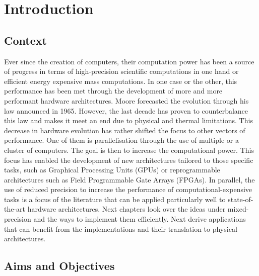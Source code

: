 \chapter{Introduction}\label{chap_intro} %

\label{Chapter1} %



\section{Context}

Ever since the creation of computers, their computation power has been a source of progress in terms of high-precision scientific computations in one hand or efficient energy expensive mass computations. In one case or the other, this performance has been met through the development of more and more performant hardware architectures. Moore forecasted the evolution through his law announced in 1965. However, the last decade has proven to counterbalance this law and makes it meet an end due to physical and thermal limitations. This decrease in hardware evolution has rather shifted the focus to other vectors of performance. One of them is parallelisation through the use of multiple or a cluster of computers. The goal is then to increase the computational power. This focus has enabled the development of new architectures tailored to those specific tasks, such as Graphical Processing Units (GPUs) or reprogrammable architectures such as Field Programmable Gate Arrays (FPGAs). In parallel, the use of reduced precision to increase the performance of computational-expensive tasks is a focus of the literature that can be applied particularly well to state-of-the-art hardware architectures. Next chapters look over the ideas under mixed-precision and the ways to implement them efficiently. Next derive applications that can benefit from the implementations and their translation to physical architectures.

\section{Aims and Objectives}

